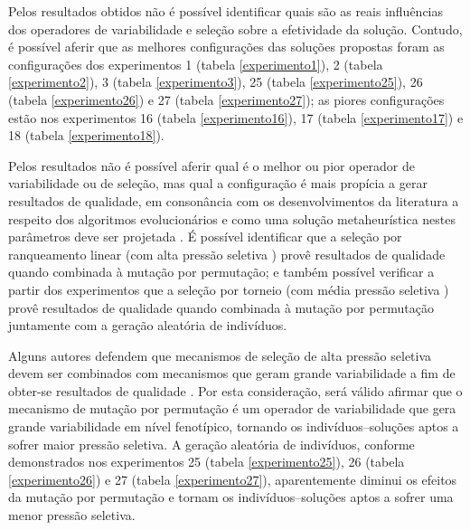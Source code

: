 \documentclass[relatorio,nocolorlinks]{inf-ufg}
\begin{document}
Pelos resultados obtidos n\~{a}o \'{e} poss\'{i}vel identificar quais s\~{a}o as reais influ\^{e}ncias dos operadores de variabilidade e
sele\c{c}\~{a}o sobre a efetividade da solu\c{c}\~{a}o. Contudo, \'{e} poss\'{i}vel aferir que as melhores configura\c{c}\~{o}es das solu\c{c}\~{o}es
propostas foram as configura\c{c}\~{o}es dos experimentos 1 (tabela \ref{experimento1}), 2 (tabela \ref{experimento2}), 3 (tabela \ref{experimento3}),
25 (tabela \ref{experimento25}), 26 (tabela \ref{experimento26}) e 27 (tabela \ref{experimento27}); as piores configura\c{c}\~{o}es est\~{a}o nos
experimentos 16 (tabela \ref{experimento16}), 17 (tabela \ref{experimento17}) e 18 (tabela \ref{experimento18}).

Pelos resultados n\~{a}o \'{e} poss\'{i}vel aferir qual \'{e} o melhor ou pior operador de variabilidade ou de sele\c{c}\~{a}o, mas qual a
configura\c{c}\~{a}o \'{e} mais prop\'{i}cia a gerar resultados de qualidade, em conson\^{a}ncia com os desenvolvimentos da literatura a respeito dos
algoritmos evolucion\'{a}rios e como uma solu\c{c}\~{a}o metaheur\'{i}stica nestes par\^{a}metros deve ser projetada \cite{DeJong2006}. \'{E}
poss\'{i}vel identificar que a sele\c{c}\~{a}o por ranqueamento linear (com alta press\~{a}o seletiva \cite{DeJong2006} \cite{Engelbrecht2007})
prov\^{e} resultados de qualidade quando combinada \`{a} muta\c{c}\~{a}o por permuta\c{c}\~{a}o; e tamb\'{e}m poss\'{i}vel verificar a partir dos
experimentos que a sele\c{c}\~{a}o por torneio (com m\'{e}dia press\~{a}o seletiva \cite{DeJong2006} \cite{Engelbrecht2007}) prov\^{e} resultados
de qualidade quando combinada \`{a} muta\c{c}\~{a}o por permuta\c{c}\~{a}o juntamente com a gera\c{c}\~{a}o aleat\'{o}ria de indiv\'{i}duos.

Alguns autores defendem que mecanismos de sele\c{c}\~{a}o de alta press\~{a}o seletiva devem ser combinados com mecanismos que geram grande
variabilidade a fim de obter-se resultados de qualidade \cite{DeJong2006}. Por esta considera\c{c}\~{a}o, ser\'{a} v\'{a}lido afirmar que o mecanismo
de muta\c{c}\~{a}o por permuta\c{c}\~{a}o \'{e} um operador de variabilidade que gera grande variabilidade em n\'{i}vel fenot\'{i}pico, tornando
os indiv\'{i}duos--solu\c{c}\~{o}es aptos a sofrer maior press\~{a}o seletiva. A gera\c{c}\~{a}o aleat\'{o}ria de indiv\'{i}duos, conforme
demonstrados nos experimentos 25 (tabela \ref{experimento25}), 26 (tabela \ref{experimento26}) e 27 (tabela \ref{experimento27}), aparentemente
diminui os efeitos da muta\c{c}\~{a}o por permuta\c{c}\~{a}o e tornam os indiv\'{i}duos--solu\c{c}\~{o}es aptos a sofrer uma menor press\~{a}o
seletiva.
\end{document}
